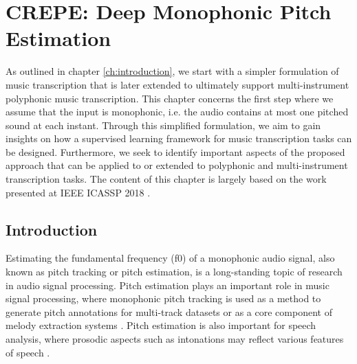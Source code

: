 
\graphicspath{{4-monophonic/figures/}}

\chapter{CREPE: Deep Monophonic Pitch Estimation}
\label{ch:monophonic}

As outlined in chapter \ref{ch:introduction}, we start with a simpler formulation of music transcription that is later extended to ultimately support multi-instrument polyphonic music transcription.
This chapter concerns the first step where we assume that the input is monophonic, i.e. the audio contains at most one pitched sound at each instant.
Through this simplified formulation, we aim to gain insights on how a supervised learning framework for music transcription tasks can be designed.
Furthermore, we seek to identify important aspects of the proposed approach that can be applied to or extended to polyphonic and multi-instrument transcription tasks.
The content of this chapter is largely based on the work presented at IEEE ICASSP 2018 \cite{kim2018crepe}.

\section{Introduction}\label{sec:introduction}

Estimating the fundamental frequency (f0) of a monophonic audio signal, also known as pitch tracking or pitch estimation, is a long-standing topic of research in audio signal processing.
Pitch estimation plays an important role in music signal processing, where monophonic pitch tracking is used as a method to generate pitch annotations for multi-track datasets \cite{bittner2014medleydb} or as a core component of melody extraction systems \cite{bosch2014melody, mauch2015computer}. 
Pitch estimation is also important for speech analysis, where prosodic aspects such as intonations may reflect various features of speech \cite{zubizarreta1998prosody}.

